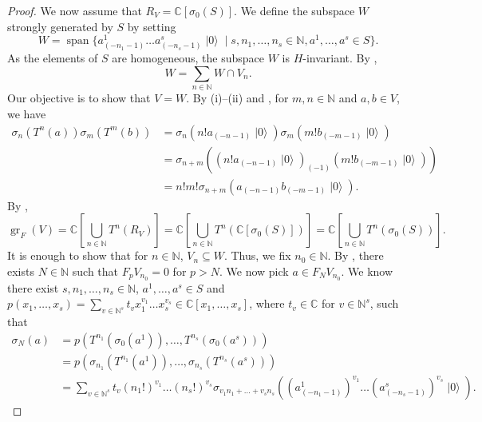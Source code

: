 \documentclass[a4paper, 12pt, reqno]{amsart}
\theoremstyle{remark}
\DeclareMathOperator{\gr}{gr}
\DeclareMathOperator{\vspan}{span}
\DeclareMathOperator{\vac}{|0\rangle}
\begin{document}
\begin{proof}
  We now assume that $R_V = \mathbb{C}[\sigma_0(S)]$.
  We define the subspace $W$ strongly generated by $S$ by setting
  \begin{equation*}
    W = \vspan\{a^1_{(-n_1 - 1)}\dots a^s_{(-n_s - 1)}\vac \mid s, n_1, \dots, n_s \in \mathbb{N}, a^1, \dots, a^s \in S\}.
  \end{equation*}
  As the elements of $S$ are homogeneous, the subspace $W$ is $H$-invariant.
  By ,
  \begin{equation}
    \label{eq:49}
    W = \sum_{n \in \mathbb{N}}W \cap V_n.
  \end{equation}
  Our objective is to show that $V = W$.
  By (i)--(ii) and , for $m, n \in \mathbb{N}$ and $a, b \in V$, we have
  \begin{align*}
    \sigma_n(T^n(a))\sigma_m(T^m(b)) &= \sigma_n(n!a_{(-n - 1)}\vac)\sigma_m(m!b_{(-m - 1)}\vac) \\
                                     &= \sigma_{n + m}((n!a_{(-n - 1)}\vac)_{(-1)}(m!b_{(-m - 1)}\vac)) \\
                                     &= n!m!\sigma_{n + m}(a_{(-n - 1)}b_{(-m - 1)}\vac).
  \end{align*}
  By ,
  \begin{equation*}
    \gr_F(V) = \mathbb{C}\left[\bigcup_{n \in \mathbb{N}}T^n(R_V)\right] = \mathbb{C}\left[\bigcup_{n \in \mathbb{N}}T^n(\mathbb{C}[\sigma_0(S)])\right] = \mathbb{C}\left[\bigcup_{n \in \mathbb{N}}T^n(\sigma_0(S))\right].
  \end{equation*}
  It is enough to show that for $n \in \mathbb{N}$, $V_n \subseteq W$.
  Thus, we fix $n_0 \in \mathbb{N}$.
  By , there exists $N \in \mathbb{N}$ such that $F_pV_{n_0} = 0$ for $p > N$.
  We now pick $a \in F_NV_{n_0}$.
  We know there exist $s, n_1, \dots, n_s \in \mathbb{N}$, $a^1, \dots, a^s \in S$ and $p(x_1, \dots, x_s) = \sum_{v \in \mathbb{N}^s}t_vx_1^{v_1}\dots x_s^{v_s} \in \mathbb{C}[x_1, \dots, x_s]$, where $t_v \in \mathbb{C}$ for $v \in \mathbb{N}^s$, such that
  \begin{align*}
    \sigma_N(a) &= p(T^{n_1}(\sigma_0(a^1)), \dots, T^{n_s}(\sigma_0(a^s))) \\
                &= p(\sigma_{n_1}(T^{n_1}(a^1)), \dots, \sigma_{n_s}(T^{n_s}(a^s))) \\
                &= \sum_{v \in \mathbb{N}^s}t_v(n_1!)^{v_1}\dots(n_s!)^{v_s}\sigma_{v_1n_1 + \dots + v_sn_s}((a^1_{(-n_1 - 1)})^{v_1}\dots(a^s_{(-n_s - 1)})^{v_s}\vac).
  \end{align*}

\end{proof}
\end{document}
